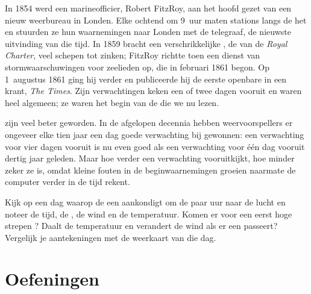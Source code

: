 \begin{history}
In 1854 werd een marineofficier, Robert FitzRoy, aan het hoofd gezet van
een nieuw weerbureau in Londen. Elke ochtend om 9~uur maten stations langs
de  het  en stuurden ze hun waarnemingen naar Londen met de
telegraaf, de nieuwste uitvinding van die tijd. In 1859 bracht een
verschrikkelijke , de  van de \emph{Royal Charter}, veel schepen
tot zinken; FitzRoy richtte toen een dienst van stormwaarschuwingen voor
zeelieden op, die in februari 1861 begon. Op 1~augustus 1861 ging hij
verder en publiceerde hij de eerste openbare  in een krant,
\emph{The Times}. Zijn verwachtingen keken een of twee dagen vooruit en
waren heel algemeen; ze waren het begin van de  die we
nu lezen.
\end{history}

 zijn veel beter geworden. In de afgelopen decennia
hebben weervoorspellers er ongeveer elke tien jaar een dag goede
verwachting bij gewonnen: een verwachting voor vier dagen vooruit is nu
even goed als een verwachting voor één dag vooruit dertig jaar geleden.
Maar hoe verder een verwachting vooruitkijkt, hoe minder zeker ze is,
omdat kleine fouten in de beginwaarnemingen groeien naarmate de computer
verder in de tijd rekent.

\begin{inthefield}
Kijk op een dag waarop de  een  aankondigt om de paar
uur naar de lucht en noteer de tijd, de , de wind en de temperatuur.
Komen er voor een  eerst hoge strepen ? Daalt de
temperatuur en verandert de wind als er een  passeert? Vergelijk
je aantekeningen met de weerkaart van die dag.
\end{inthefield}

\section{Oefeningen}

